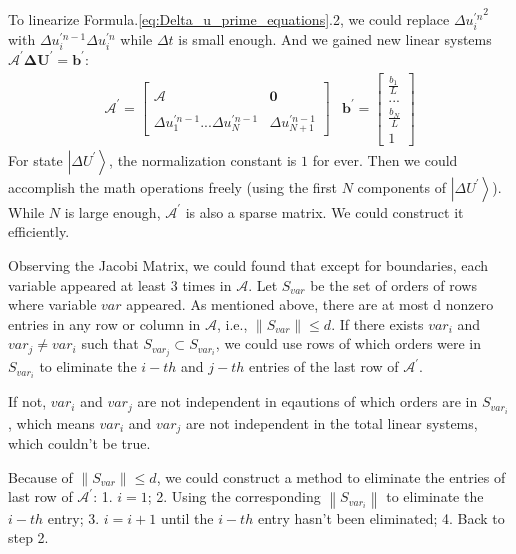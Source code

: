\documentclass[%
 reprint,
 amsmath,amssymb,
pra,
]{revtex4-1}
\begin{document}
To linearize Formula.\ref{eq:Delta_u_prime_equations}.2, we could replace ${\Delta u^{\prime n}_i}^2$ with $\Delta u^{\prime n - 1}_i \Delta u^{\prime n}_i$ while $\Delta t$ is small enough. And we gained new linear systems $\mathcal{A^{\prime}} \bm{\Delta U^{\prime}} = \bm{b^{\prime}}$: 
\begin{equation}
\begin{array}{cc}
	\mathcal{A^{\prime}} = \left[
	\begin{array}{cc}
		&\\
		\mathcal{A} & \bm{0}\\
		&\\
		\Delta u^{\prime n - 1}_1...\Delta u^{\prime n - 1}_N&\Delta u^{\prime n - 1}_{N+1}
	\end{array}
	\right]
	&
	\bm{b^{\prime}} = \left[
	\begin{array}{c}
		\frac{b_1}{L}\\
		...\\
		\frac{b_N}{L}\\
		1
	\end{array}
	\right]
	
\end{array}
\end{equation}
For state $\left|\Delta U^{\prime}\right\rangle$, the normalization constant is $1$ for ever. Then we could accomplish the math operations freely (using the first $N$ components of $\left|\Delta U^{\prime}\right\rangle$). While $N$ is large enough, $\mathcal{A^{\prime}}$ is also a sparse matrix. We could construct it efficiently.

\iffalse
Observing the Jacobi Matrix, we could found that except for boundaries, each variable appeared at least $3$ times in $\mathcal{A}$. Let $S_{var}$ be the set of orders of rows where variable $var$ appeared. As mentioned above, there are at most d nonzero entries in any row or column in $\mathcal{A}$, i.e., $\left\|S_{var}\right\|\leq d$. If there exists $var_i$ and $var_j\neq var_i$ such that $S_{var_j}\subset S_{var_i}$, we could use rows of which orders were in $S_{var_i}$ to eliminate the $i-th$ and $j-th$ entries of the last row of $\mathcal{A^{\prime}}$. 

If not, $var_i$ and $var_j$ are not independent in eqautions of which orders are in $S_{var_i}$,  which means $var_i$ and $var_j$ are not independent in the total linear systems, which couldn't be true. 

Because of $\left\|S_{var}\right\|\leq d$, we could construct a method to eliminate the entries of last row of $\mathcal{A^{\prime}}$: 1. $i=1$; 2. Using the corresponding $\left\|S_{var_i}\right\|$ to eliminate the $i-th$ entry; 3. $i=i+1$ until the $i-th$ entry hasn't been eliminated; 4. Back to step 2. 
\end{document}

